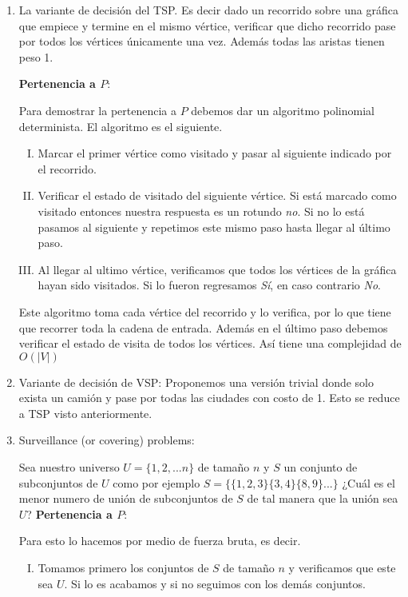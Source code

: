 \documentclass[12pt,letterpaper]{article}
\begin{document}
\begin{itemize}
\begin{enumerate}
    \item La variante de decisión del TSP. Es decir dado un recorrido sobre una gráfica que empiece y termine en el mismo vértice, verificar que dicho recorrido pase por todos los vértices únicamente una vez. Además todas las aristas tienen peso 1.
    
    \textbf{Pertenencia a $P$}:
    
    Para demostrar la pertenencia a $P$ debemos dar un algoritmo polinomial determinista. El algoritmo es el siguiente.
    \begin{enumerate}[I.]
        \item Marcar el primer vértice como visitado y pasar al siguiente indicado por el recorrido.
        
        \item Verificar el estado de visitado del siguiente vértice. Si está marcado como visitado entonces nuestra respuesta es un rotundo \textit{no}. Si no lo está pasamos al siguiente y repetimos este mismo paso hasta llegar al último paso.
        
        \item Al llegar al ultimo vértice, verificamos que todos los vértices de la gráfica hayan sido visitados. Si lo fueron regresamos \textit{Sí}, en caso contrario \textit{No}.
    \end{enumerate}
    Este algoritmo toma cada vértice del recorrido y lo verifica, por lo que tiene que recorrer toda la cadena de entrada. Además en el último paso debemos verificar el estado de visita de todos los vértices. Así tiene una complejidad de $O(|V|)$\\
    
    \item Variante de decisión de VSP: Proponemos una versión trivial donde solo exista un camión y pase por todas las ciudades con costo de 1. Esto se reduce a TSP visto anteriormente.\\
    
    \item Surveillance (or covering) problems: 
    
    Sea nuestro universo $U=\{1,2,...n\}$ de tamaño $n$ y $S$ un conjunto de subconjuntos de $U$ como por ejemplo $S = \{\{1,2,3\}\{3,4\}\{8,9\}... \}$ ¿Cuál es el menor numero de unión de subconjuntos de $S$ de tal manera que la unión sea $U$?
 \newpage
 \textbf{Pertenencia a $P$}:
 
 Para esto lo hacemos por medio de fuerza bruta, es decir. 
 \begin{enumerate}[I.]
     \item Tomamos primero los conjuntos de $S$ de tamaño $n$ y verificamos que este sea $U$. Si lo es acabamos y si no seguimos con los demás conjuntos.
    

\end{enumerate}
\end{enumerate}
\end{itemize}
\end{document}
